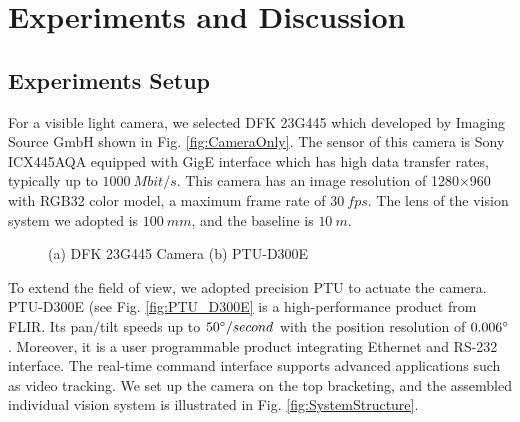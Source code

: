 \section{Experiments and Discussion}
\subsection{Experiments Setup}

For a visible light camera, we selected DFK 23G445 which developed by Imaging Source GmbH shown in Fig. \ref{fig:CameraOnly}. The sensor of this camera is Sony ICX445AQA equipped with GigE interface which has high data transfer rates, typically up to $1000\ Mbit/s$. This camera has an image resolution of 1280$\times$960 with RGB32 color model, a maximum frame rate of $30\ fps$. The lens of the vision system we adopted is $100\ mm$, and the baseline is $10\ m$. 


\begin{figure}[!tb]
	\centering
	\caption{(a) DFK 23G445 Camera (b) PTU-D300E}
\end{figure}
To extend the field of view, we adopted precision PTU to actuate the camera. PTU-D300E (see Fig. \ref{fig:PTU_D300E} is a high-performance product from FLIR. Its pan/tilt speeds up to $50\degree/second$ with the position resolution of $0.006\degree$. Moreover, it is a user programmable product integrating Ethernet and RS-232 interface. The real-time command interface supports advanced applications such as video tracking. We set up the camera on the top bracketing, and the assembled individual vision system is illustrated in Fig. \ref{fig:SystemStructure}. 


